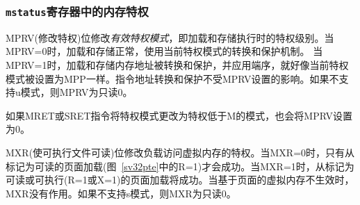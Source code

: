 \subsubsection{{\tt mstatus}寄存器中的内存特权}

\iffalse
The MPRV (Modify PRiVilege) bit modifies the {\em effective privilege mode},
i.e., the privilege level at which loads
and stores execute.  When MPRV=0, loads and stores
behave as normal, using the translation and protection mechanisms of the
current privilege mode.
When MPRV=1, load and store memory addresses are translated and protected, and
endianness is applied, as though the current privilege mode were set to MPP.
Instruction address-translation and protection are unaffected by the setting
of MPRV.  MPRV is read-only 0 if U-mode is not supported.

An MRET or SRET instruction that changes the privilege mode to a mode
less privileged than M also sets MPRV=0.

The MXR (Make eXecutable Readable) bit modifies the privilege with which loads
access virtual memory.  When MXR=0, only loads from pages marked readable (R=1
in Figure~\ref{sv32pte}) will succeed.  When MXR=1, loads from pages marked
either readable or executable (R=1 or X=1) will succeed.  MXR has no effect
when page-based virtual memory is not in effect.  MXR is read-only 0 if
S-mode is not supported.
\fi

MPRV(修改特权)位修改{\em 有效特权模式}，即加载和存储执行时的特权级别。当MPRV=0时，加载和存储正常，使用当前特权模式的转换和保护机制。
当MPRV=1时，加载和存储内存地址被转换和保护，并应用端序，就好像当前特权模式被设置为MPP一样。指令地址转换和保护不受MPRV设置的影响。如果不支持u模式，则MPRV为只读0。

如果MRET或SRET指令将特权模式更改为特权低于M的模式，也会将MPRV设置为0。

MXR(使可执行文件可读)位修改负载访问虚拟内存的特权。当MXR=0时，只有从标记为可读的页面加载(图~\ref{sv32pte}中的R=1)才会成功。当MXR=1时，从标记为可读或可执行(R=1或X=1)的页面加载将成功。当基于页面的虚拟内存不生效时，MXR没有作用。如果不支持s模式，则MXR为只读0。

\iffalse
\begin{commentary}
The MPRV and MXR mechanisms were conceived to improve the efficiency of M-mode
routines that emulate missing hardware features, e.g., misaligned loads and
stores.  MPRV obviates the need to perform address translation in software.
MXR allows instruction words to be loaded from pages marked execute-only.

The current privilege mode and the privilege mode specified by MPP might have
different XLEN settings.  When MPRV=1, load and store memory addresses are
treated as though the current XLEN were set to MPP's XLEN, following the rules
in Section~\ref{xlen-control}.
\end{commentary}
\fi

